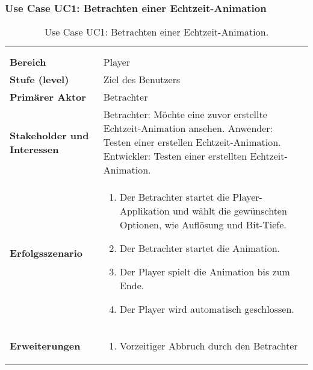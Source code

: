 
\subsubsection{Use Case UC1: Betrachten einer Echtzeit-Animation}
\label{ssubsec:requirements:use-cases:uc1}

\begin{longtabu}{p{0.3\textwidth}p{0.7\textwidth}}
    \centering\\
    \caption{Use Case UC1: Betrachten einer
        Echtzeit-Animation.}\label{table:uc1-watch-demo}\\
    \toprule
        \textbf{Bereich} &
        Player\\
    \cmidrule(r){1-1}\cmidrule(lr){2-2}
        \textbf{Stufe (level)} &
        Ziel des Benutzers \\
    \cmidrule(r){1-1}\cmidrule(lr){2-2}
        \textbf{Primärer Aktor} &
        Betrachter \\
    \cmidrule(r){1-1}\cmidrule(lr){2-2}
        \textbf{Stakeholder und Interessen} &
        Betrachter: Möchte eine zuvor erstellte Echtzeit-Animation ansehen.  \newline
        Anwender: Testen einer erstellen Echtzeit-Animation. \newline
        Entwickler: Testen einer erstellten Echtzeit-Animation. \\
    \cmidrule(r){1-1}\cmidrule(lr){2-2}
        \textbf{Erfolgsszenario} &
        \begin{enumerate}
            \item{Der Betrachter startet die Player-Applikation und wählt
                    die gewünschten Optionen, wie Auflösung und Bit-Tiefe.}
            \item{Der Betrachter startet die Animation.}
            \item{Der Player spielt die Animation bis zum Ende.}
            \item{Der Player wird automatisch geschlossen.}
        \end{enumerate} \\
    \cmidrule(r){1-1}\cmidrule(lr){2-2}
        \textbf{Erweiterungen} &
        \begin{enumerate}[label= (\alph*)]
            \item{Vorzeitiger Abbruch durch den Betrachter
}
\end{enumerate}
\end{longtabu}
